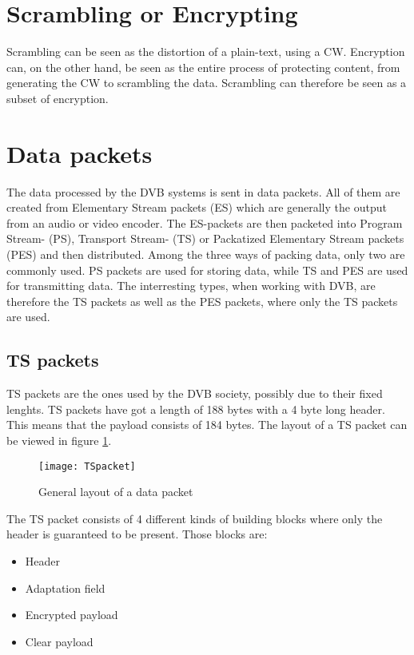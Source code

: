 
\section{Scrambling or Encrypting}
Scrambling can be seen as the distortion of a plain-text, using a CW. Encryption 
can, on the other hand, be seen as the entire process of protecting content, 
from generating the CW to scrambling the data. Scrambling can therefore be seen 
as a subset of encryption.

\section{Data packets}\label{sec:Data}
The data processed by the DVB systems is sent in data packets. All of them are 
created from Elementary Stream packets (ES) which are generally the output from 
an audio or video encoder. The ES-packets are then packeted into Program Stream-
(PS), Transport Stream- (TS) or Packatized Elementary Stream packets (PES) and 
then distributed. Among the three ways of packing data, only two are commonly 
used. PS packets are used for storing data, while TS and PES are used for 
transmitting data. The interresting types, when working with DVB, are therefore 
the TS packets as well as the PES packets, where only the TS packets are used.

\subsection{TS packets}
TS packets are the ones used by the DVB society, possibly due to their fixed 
lenghts. TS packets have got a length of 188 bytes with a 4 byte long header. 
This means that the payload consists of 184 bytes. The layout of a TS packet 
can be viewed in figure \ref{img:Package}\citep{DVB:2013}.

\begin{figure}
  \texttt{[image: TSpacket]}
  \caption{General layout of a data packet}
  \label{img:Package}
\end{figure}

The TS packet consists of 4 different kinds of building blocks where only the 
header is guaranteed to be present. Those blocks are:

\begin{itemize}
\item Header
\item Adaptation field
\item Encrypted payload
\item Clear payload
\end{itemize}

